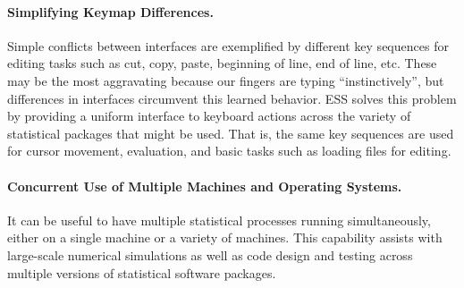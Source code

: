 \documentclass{article}
\newcommand{\stexttt}[1]{{\small\texttt{#1}}}
\begin{document}


\paragraph{Simplifying Keymap Differences.}
Simple conflicts between interfaces are exemplified by different
key sequences for editing tasks such as cut, copy, paste, beginning of
line, end of line, etc.  These may be the most aggravating because our
fingers are typing ``instinctively'', 
but differences in interfaces circumvent this learned
behavior.  ESS solves this problem by providing a uniform interface to
keyboard actions across the variety of statistical packages that
might be used.  That is, the same key sequences are used for cursor movement, 
evaluation, and basic tasks such as loading files for editing.


\paragraph{Concurrent Use of Multiple Machines and Operating Systems.}
It can be useful to have multiple statistical processes running
simultaneously, either on a single machine or a variety of machines.
This capability assists with large-scale numerical simulations 
as well as code design and testing across multiple
versions of statistical software packages.  
%
\end{document}
